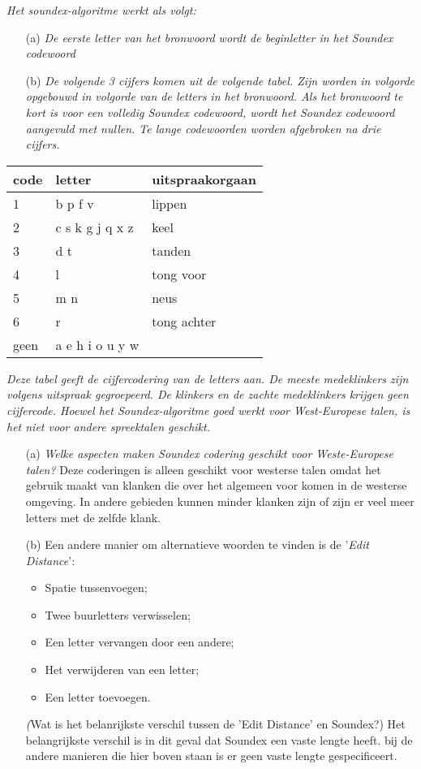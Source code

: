 \emph{Het soundex-algoritme werkt als volgt:}
\begin{itemize}
  \item[(a)]\emph{De eerste letter van het bronwoord wordt de beginletter in het Soundex codewoord}
  \item[(b)]\emph{De volgende 3 cijfers komen uit de volgende tabel. Zijn worden in volgorde opgebouwd in volgorde van de letters in het bronwoord. Als het bronwoord te kort is voor een volledig Soundex codewoord, wordt het Soundex codewoord aangevuld met nullen. Te lange codewoorden worden afgebroken na drie cijfers.}
\end{itemize}

\begin{tabular}{lll}
code & letter & uitspraakorgaan \\
\hline
1 & b p f v & lippen\\
2 & c s k g j q x z & keel\\
3 & d t & tanden\\
4 & l & tong voor\\
5 & m n & neus \\
6 & r & tong achter \\
geen & a e h i o u y w & \\
\end{tabular}

\emph{Deze tabel geeft de cijfercodering van de letters aan. De meeste medeklinkers zijn volgens uitspraak gegroepeerd. De klinkers en de zachte medeklinkers krijgen geen cijfercode. Hoewel het Soundex-algoritme goed werkt voor West-Europese talen, is het niet voor andere spreektalen geschikt.}
\begin{itemize}
  \item[(a)] \emph{Welke aspecten maken Soundex codering geschikt voor Weste-Europese talen?}
    Deze coderingen is alleen geschikt voor westerse talen omdat het gebruik maakt van klanken die over het algemeen voor komen in de westerse omgeving. In andere gebieden kunnen minder klanken zijn of zijn er veel meer letters met de zelfde klank.
  \item[(b)] Een andere manier om alternatieve woorden te vinden is de '\emph{Edit Distance}':
    \begin{itemize}
      \item Spatie tussenvoegen;
      \item Twee buurletters verwisselen;
      \item Een letter vervangen door een andere;
      \item Het verwijderen van een letter;
      \item Een letter toevoegen.
    \end{itemize}
    \emph(Wat is het belanrijkste verschil tussen de 'Edit Distance' en Soundex?)
    Het belangrijkste verschil is in dit geval dat Soundex een vaste lengte heeft. bij de andere manieren die hier boven staan is er geen vaste lengte gespecificeert.
\end{itemize}

